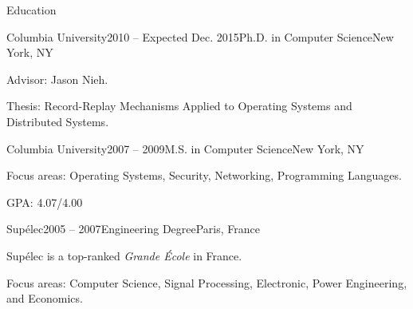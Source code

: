 \documentclass{resume} %
\newcommand{\columbia}{{Columbia University}\xspace}
\newcommand{\supelec}{{Sup\'{e}lec}\xspace}
\newcommand{\eiffel}{{Lyc\'{e}e Gustave Eiffel}\xspace}
\begin{document}
\vspace{-1em}


\begin{rSection}{Education}

\begin{rSubsection}{\columbia}{2010 -- Expected Dec. 2015}{Ph.D. in Computer Science}{New York, NY}
\item Advisor: Jason Nieh.
\item Thesis: Record-Replay Mechanisms Applied to Operating Systems and Distributed Systems.
\end{rSubsection}

\begin{rSubsection}{\columbia}{2007 -- 2009}{M.S. in Computer Science}{New York, NY}
\item Focus areas: Operating Systems, Security, Networking, Programming Languages.
\item GPA: 4.07/4.00
\end{rSubsection}

\begin{rSubsection}{\supelec}{2005 -- 2007}{Engineering Degree}{Paris, France}
\item \supelec is a top-ranked {\em Grande \'{E}cole} in France.
\item Focus areas: Computer Science, Signal Processing, Electronic, Power Engineering, and Economics.
\end{rSubsection}


\end{rSection}

\end{document}
